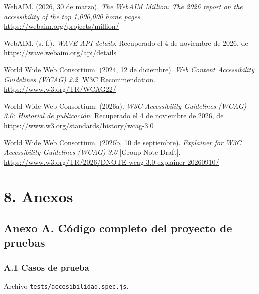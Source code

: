 \documentclass[10pt,letterpaper,onecolumn]{IEEEtran}
\begin{document}
WebAIM. (2026, 30 de marzo). \emph{The WebAIM Million: The 2026 report on the accessibility of the top 1,000,000 home pages}. \url{https://webaim.org/projects/million/}

WebAIM. (s. f.). \emph{WAVE API details}. Recuperado el 4 de noviembre de 2026, de \url{https://wave.webaim.org/api/details}

World Wide Web Consortium. (2024, 12 de diciembre). \emph{Web Content Accessibility Guidelines (WCAG) 2.2}. W3C Recommendation. \url{https://www.w3.org/TR/WCAG22/}

World Wide Web Consortium. (2026a). \emph{W3C Accessibility Guidelines (WCAG) 3.0: Historial de publicación}. Recuperado el 4 de noviembre de 2026, de \url{https://www.w3.org/standards/history/wcag-3.0}

World Wide Web Consortium. (2026b, 10 de septiembre). \emph{Explainer for W3C Accessibility Guidelines (WCAG) 3.0} {[}Group Note Draft{]}. \url{https://www.w3.org/TR/2026/DNOTE-wcag-3.0-explainer-20260910/}

\section{8. Anexos}\label{anexos}

\subsection{Anexo A. Código completo del proyecto de pruebas}\label{anexo-a.-cuxf3digo-completo-del-proyecto-de-pruebas}

\subsubsection{A.1 Casos de prueba}\label{a.1-casos-de-prueba}

Archivo \texttt{tests/\allowbreak{}\allowbreak{}accesibilidad.\allowbreak{}\allowbreak{}spec.\allowbreak{}\allowbreak{}js}.
\end{document}
